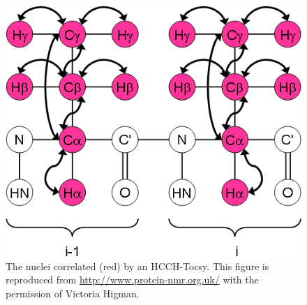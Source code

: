 \begin{figure}
  \includegraphics[scale=0.75]{figures/ccpn_hcchtocsy}
  \caption[The nuclei correlated by an HCCH-Tocsy.]
          {The nuclei correlated (red) by an HCCH-Tocsy.
           This figure is reproduced from \url{http://www.protein-nmr.org.uk/}
           with the permission of Victoria Higman.}
  \label{ccpn_hcchtocsy}
\end{figure}

